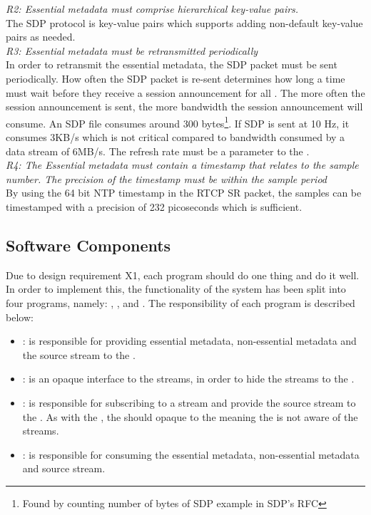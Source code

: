 \noindent \textit{R2: Essential metadata must comprise hierarchical key-value pairs.}\\
The SDP protocol is key-value pairs which supports adding non-default key-value pairs as needed. \\

\noindent \textit{R3: Essential metadata must be retransmitted periodically}\\
In order to retransmit the essential metadata, the SDP packet must be sent periodically. How often the SDP packet is re-sent determines how long a time  must wait before they receive a session announcement for all . The more often the session announcement is sent, the more bandwidth the session announcement will consume. An SDP file consumes around 300 bytes\footnote{Found by counting number of bytes of SDP example in SDP's RFC}. If SDP is sent at 10 Hz, it consumes 3KB/s which is not critical compared to bandwidth consumed by a data stream of 6MB/s. The refresh rate must be a parameter to the . \\

\noindent \textit{R4: The Essential metadata must contain a timestamp that relates to the sample number. The precision of the timestamp must be within the sample period}\\
By using the 64 bit NTP timestamp in the RTCP SR packet, the samples can be timestamped with a precision of 232 picoseconds\citep{RFC5905} which is sufficient.



\subsection{Software Components}
Due to design requirement X1, each program should do one thing and do it well.
In order to implement this, the functionality of the system has been split into four programs, namely: \pub{}, \sub{}, \pro{} and \con{}. The responsibility of each program is described below:

\begin{itemize}
	\item \pro: is responsible for providing essential metadata, non-essential metadata and the source stream to the \pub.
	
	\item \pub: is an opaque interface to the streams, in order to hide the streams to the \pro{}. 
	
	\item \sub{}: is responsible for subscribing to a stream and provide the source stream to the \con{}. As with the \pub{}, the \sub{} should opaque to the \con{} meaning the \con{} is not aware of the streams. 
	
	\item \con{}: is responsible for consuming the essential metadata, non-essential metadata and source stream.
\end{itemize}

